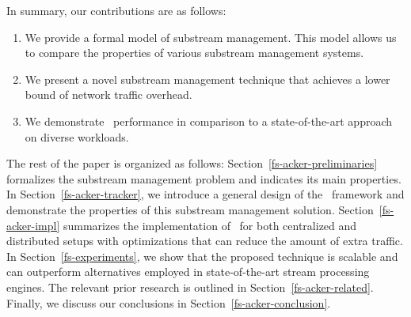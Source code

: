 In summary, our contributions are as follows:
\begin{enumerate}
    \item We provide a formal model of substream management. This model allows us to compare the properties of various substream management systems.
    \item We present a novel substream management technique that achieves a lower bound of network traffic overhead.
    \item We demonstrate \tracker\ performance in comparison to a state-of-the-art approach on diverse workloads.
\end{enumerate}

The rest of the paper is organized as follows: Section~\ref{fs-acker-preliminaries} formalizes the substream management problem and indicates its main properties. In Section~\ref{fs-acker-tracker}, we introduce a general design of the \tracker\ framework and demonstrate the properties of this substream management solution. Section~\ref{fs-acker-impl} summarizes the implementation of \tracker\ for both centralized and distributed setups with optimizations that can reduce the amount of extra traffic. In Section~\ref{fs-experiments}, we show that the proposed technique is scalable and can outperform alternatives employed in state-of-the-art stream processing engines. The relevant prior research is outlined in Section~\ref{fs-acker-related}. Finally, we discuss our conclusions in Section~\ref{fs-acker-conclusion}.